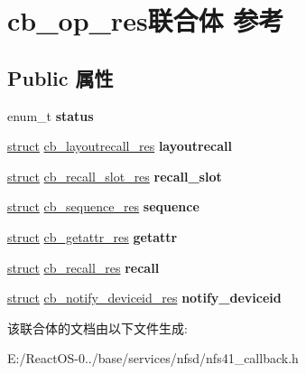 \hypertarget{unioncb__op__res}{}\section{cb\+\_\+op\+\_\+res联合体 参考}
\label{unioncb__op__res}
\subsection*{Public 属性}
\begin{DoxyCompactItemize}
\item 
\mbox{\label{unioncb__op__res_a7b3fa76ce5087d3f00fb01c2bbe3ca11}} 
enum\+\_\+t {\bfseries status}
\item 
\mbox{\label{unioncb__op__res_ab54d5f425676ddff1fd1f73130a09ef4}} 
\hyperlink{interfacestruct}{struct} \hyperlink{structcb__layoutrecall__res}{cb\+\_\+layoutrecall\+\_\+res} {\bfseries layoutrecall}
\item 
\mbox{\label{unioncb__op__res_ac8566936e068d07c5d4b93c83f031bde}} 
\hyperlink{interfacestruct}{struct} \hyperlink{structcb__recall__slot__res}{cb\+\_\+recall\+\_\+slot\+\_\+res} {\bfseries recall\+\_\+slot}
\item 
\mbox{\label{unioncb__op__res_a53478d05d0b28f2656145b8a8f643ac3}} 
\hyperlink{interfacestruct}{struct} \hyperlink{structcb__sequence__res}{cb\+\_\+sequence\+\_\+res} {\bfseries sequence}
\item 
\mbox{\label{unioncb__op__res_a3734d1269f7b393f1acc396805debdd0}} 
\hyperlink{interfacestruct}{struct} \hyperlink{structcb__getattr__res}{cb\+\_\+getattr\+\_\+res} {\bfseries getattr}
\item 
\mbox{\label{unioncb__op__res_af618f3ccd5d070a0fa7f477ed1dce0bd}} 
\hyperlink{interfacestruct}{struct} \hyperlink{structcb__recall__res}{cb\+\_\+recall\+\_\+res} {\bfseries recall}
\item 
\mbox{\label{unioncb__op__res_ae9035c03d02bf7cad1ad23f7973d7f5c}} 
\hyperlink{interfacestruct}{struct} \hyperlink{structcb__notify__deviceid__res}{cb\+\_\+notify\+\_\+deviceid\+\_\+res} {\bfseries notify\+\_\+deviceid}
\end{DoxyCompactItemize}


该联合体的文档由以下文件生成\+:\begin{DoxyCompactItemize}
\item 
E\+:/\+React\+O\+S-\/0../base/services/nfsd/nfs41\+\_\+callback.\+h\end{DoxyCompactItemize}
